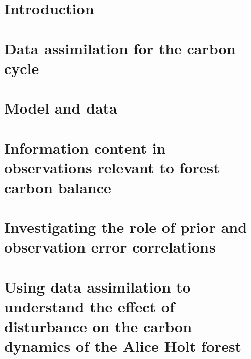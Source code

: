 





\tableofcontents


\chapter{Introduction}
\label{chap:intro}


%

\chapter{Data assimilation for the carbon cycle}
\label{chap:litrev}


\chapter{Model and data}
\label{chap:data}


\chapter{Information content in observations relevant to forest carbon balance}
\label{chap:info_con}


\chapter{Investigating the role of prior and observation error correlations}
\label{chap:error_corrs}


\chapter{Using data assimilation to understand the effect of disturbance on the carbon dynamics of the Alice Holt forest}
\label{chap:disturbance}


